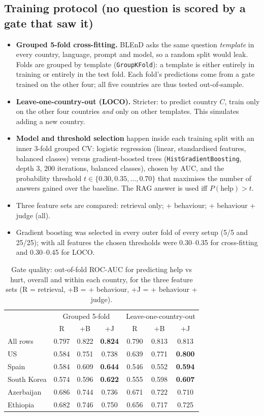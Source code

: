 \documentclass[11pt]{article}
\begin{document}
\subsection{Training protocol (no question is scored by a gate that saw it)}
\label{sec:protocol}
\begin{itemize}
\item \textbf{Grouped 5-fold cross-fitting.} BLEnD asks the same question \emph{template} in every
country, language, prompt and model, so a random split would leak. Folds are grouped by template
(\texttt{GroupKFold}): a template is either entirely in training or entirely in the test fold. Each
fold's predictions come from a gate trained on the other four; all five countries are thus tested
out-of-sample.
\item \textbf{Leave-one-country-out (LOCO).} Stricter: to predict country $C$, train only on the other
four countries \emph{and} only on other templates. This simulates adding a new country.
\item \textbf{Model and threshold selection} happen inside each training split with an inner
3-fold grouped CV: logistic regression (linear, standardised features, balanced classes) versus
gradient-boosted trees (\texttt{HistGradientBoosting}, depth 3, 200 iterations, balanced classes),
chosen by AUC, and the probability threshold $t \in \{0.30, 0.35, \ldots, 0.70\}$ that maximises the
number of answers gained over the baseline. The RAG answer is used iff $P(\text{help}) > t$.
\item Three feature sets are compared: retrieval only; + behaviour; + behaviour + judge (all).
\item Gradient boosting was selected in every outer fold of every setup (5/5 and 25/25); with all
features the chosen thresholds were 0.30--0.35 for cross-fitting and 0.30--0.45 for LOCO.
\end{itemize}

\begin{table}[h]
\centering
\caption{Gate quality: out-of-fold ROC-AUC for predicting help vs hurt, overall and within each
country, for the three feature sets (R = retrieval, +B = + behaviour, +J = + behaviour + judge).}
\label{tab:auc}
\small
\begin{tabular}{l|ccc|ccc}
\toprule
 & \multicolumn{3}{c|}{Grouped 5-fold} & \multicolumn{3}{c}{Leave-one-country-out} \\
 & R & +B & +J & R & +B & +J \\
\midrule
All rows    & 0.797 & 0.822 & \textbf{0.824} & 0.790 & 0.813 & 0.813 \\
US          & 0.584 & 0.751 & 0.738 & 0.639 & 0.771 & \textbf{0.800} \\
Spain       & 0.584 & 0.609 & \textbf{0.644} & 0.546 & 0.552 & \textbf{0.594} \\
South Korea & 0.574 & 0.596 & \textbf{0.622} & 0.555 & 0.598 & \textbf{0.607} \\
Azerbaijan  & 0.686 & 0.744 & 0.736 & 0.671 & 0.722 & 0.710 \\
Ethiopia    & 0.682 & 0.746 & 0.750 & 0.656 & 0.717 & 0.725 \\
\bottomrule
\end{tabular}
\end{table}
\end{document}
